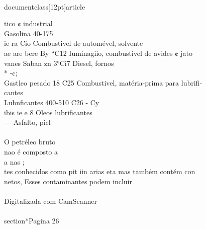 \\documentclass[12pt]{article}
\begin{document}
{tico ¢ industrial\\
Gasolina 40-175\\
ie ra Cio Combustivel de automével, solvente\\
ae are bere By “C12 Iuminagiio, combustivel de avides ¢ jato\\
vanes Saban zn 3°Ci7 Diesel, fornos\\
* -¢;\\
Gastleo pesado 18 C25 Combustivel, matéria-prima para lubrifi-\\
cantes\\
Lubnficantes 400-510 C26 - Cy\\
ibis ie e 8 Oleos lubrificantes\\
— Asfalto, picl\\
\\
O petréleo bruto\\
nao é composto a\\
a nas ;\\
tes conhecidos como pit iin arias eta mas também contém con\\
netos, Esses contaminantes podem incluir\\
\\
Digitalizada com CamScanner\\

\\section*{Pagina 26}

}
\end{document}
